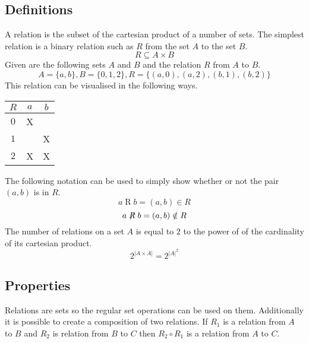 \documentclass[a4paper, 10pt]{article}
\begin{document}
\subsection{Definitions}
A relation is the subset of the cartesian product of a number of sets. The simplest relation is a binary relation such as \(R\) from the set \(A\) to the set \(B\).
\[ R\subseteq A\times B \]
Given are the following sets \(A\) and \(B\) and the relation \(R\) from \(A\) to \(B\).
\[ A = \{a,b\}, B = \{0,1,2\}, R = \{(a,0),(a,2),(b,1),(b,2)\} \]
This relation can be visualised in the following ways.
\begin{multicols}{2}
\begin{center}
\begin{tabular}{c | c c}
    \(R\) & \(a\) & \(b\) \\
    \hline
    \(0\) & X &   \\
    \(1\) &   & X \\
    \(2\) & X & X \\
\end{tabular}
\end{center}
\begin{center}
\end{center}
\end{multicols}
\noindent
The following notation can be used to simply show whether or not the pair \((a,b)\) is in \(R\).
\[ a\mathrel{R}b = (a,b)\in R \]
\[ a\not\mathrel{R}b = (a,b)\notin R \]
The number of relations on a set \(A\) is equal to \(2\) to the power of of the cardinality of its cartesian product.
\[ 2^{|A\times A|} = 2^{|A|^2} \]
\subsection{Properties}
Relations are sets so the regular set operations can be used on them. Additionally it is possible to create a composition of two relations. If \(R_1\) is a relation from \(A\) to \(B\) and \(R_2\) is relation from \(B\) to \(C\) then \(R_2\circ R_1\) is a relation from \(A\) to \(C\).
\end{document}
